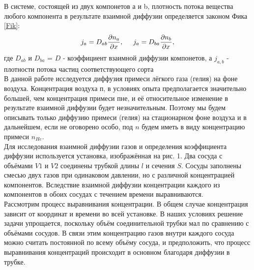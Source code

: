 \documentclass[12pt]{article}
\begin{document}
    В системе, состоящей из двух компонетов а и b, плотность потока вещества любого 
    компонента в результате взаимной диффузии определяется законом Фика \ref{Fik}:
    \begin{equation}\label{Fik}
        j_{a} = D_{ab}\frac{\partial n_{a}}{\partial x}, \hspace{0.5cm}
        j_{a} = D_{ba}\frac{\partial n_{b}}{\partial x},
    \end{equation}
    где $D_{ab}$ и $D_{ba}$ = $D$ - коэффициент взаимной диффузии компонетов, а $j_{a,b}$ - 
    плотности потока частиц соответствующего сорта\\
    В данной работе исследуется диффузия примеси лёгкого газа (гелия) на фоне воздуха. 
    Концентрация воздуха п, в условиях опыта предполагается значительно большей, чем 
    концентрация примеси пне, и её относительное изменение в результате взаимной диффузии 
    будет незначительным. Поэтому мы будем описывать только диффузию примеси (гелия) на 
    стационарном фоне воздуха и в дальнейшем, если не оговорено особо, под $n$ будем иметь в 
    виду концентрацию примеси $n_{He}$.\\
    Для исследования взаимной диффузии газов и определения коэффициента диффузии используется 
    установка, изображённая на рис. 1. Два сосуда с объёмами $V1$ и $V2$ соединены трубкой длины
    $l$ и сечения $S$. Сосуды заполнены смесью двух газов при одинаковом давлении, но с 
    различной концентрацией компонентов. Вследствие взаимной диффузии концентрации каждого из 
    компонентов в обоих сосудах с течением времени выравниваются.\\
    Рассмотрим процесс выравнивания концентрации. В общем случае концентрация зависит от 
    координат и времени во всей установке. В наших условиях решение задачи упрощается, 
    поскольку объём соединительной трубки мал по сравнению с объёмами сосудов. В связи 
    этим концентрацию газов внутри каждого сосуда можно считать постоянной по всему объёму 
    сосуда, и предположить, что процесс выравнивания концентраций происходит в основном 
    благодаря диффузии в трубке.\\
\end{document}

